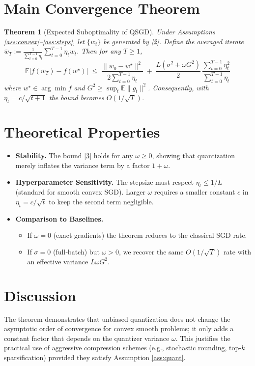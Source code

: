\documentclass{article}
\newtheorem{theorem}{Theorem}
\begin{document}
\section*{Main Convergence Theorem}
\begin{theorem}[Expected Suboptimality of QSGD]\label{thm:conv}
Under Assumptions \ref{ass:convex}–\ref{ass:steps}, let $\{w_t\}$ be generated by \eqref{2}.  
Define the averaged iterate $\bar w_T:=\frac{1}{\sum_{t=0}^{T-1}\eta_t}\sum_{t=0}^{T-1}\eta_t w_t$.  
Then for any $T\ge1$,
\[
\boxed{
\mathbb{E}\!\big[f(\bar w_T)-f(w^{\star})\big]\;\le\;
\frac{\|w_0-w^{\star}\|^{2}}{2\sum_{t=0}^{T-1}\eta_t}
\;+\;
\frac{L(\sigma^{2}+\omega G^{2})}{2}\,\frac{\sum_{t=0}^{T-1}\eta_t^{2}}{\sum_{t=0}^{T-1}\eta_t}
}
\tag{3}
\]
where $w^{\star}\in\arg\min f$ and $G^{2}\ge \sup_{t}\mathbb{E}\|g_t\|^{2}$.
Consequently, with $\eta_t=c/\sqrt{t+1}$ the bound becomes $O(1/\sqrt{T})$.
\end{theorem}

\section*{Theoretical Properties}
\begin{itemize}
\item \textbf{Stability.} The bound \eqref{3} holds for any $\omega\ge0$, showing that quantization merely inflates the variance term by a factor $1+\omega$.
\item \textbf{Hyperparameter Sensitivity.} The stepsize must respect $\eta_t\le1/L$ (standard for smooth convex SGD). Larger $\omega$ requires a smaller constant $c$ in $\eta_t=c/\sqrt{t}$ to keep the second term negligible.
\item \textbf{Comparison to Baselines.}
    \begin{itemize}
        \item If $\omega=0$ (exact gradients) the theorem reduces to the classical SGD rate.
        \item If $\sigma=0$ (full‑batch) but $\omega>0$, we recover the same $O(1/\sqrt{T})$ rate with an effective variance $L\omega G^{2}$.
    \end{itemize}
\end{itemize}

\section*{Discussion}
The theorem demonstrates that unbiased quantization does not change the asymptotic order of convergence for convex smooth problems; it only adds a constant factor that depends on the quantizer variance $\omega$. This justifies the practical use of aggressive compression schemes (e.g., stochastic rounding, top‑$k$ sparsification) provided they satisfy Assumption \ref{ass:quant}.
\end{document}
